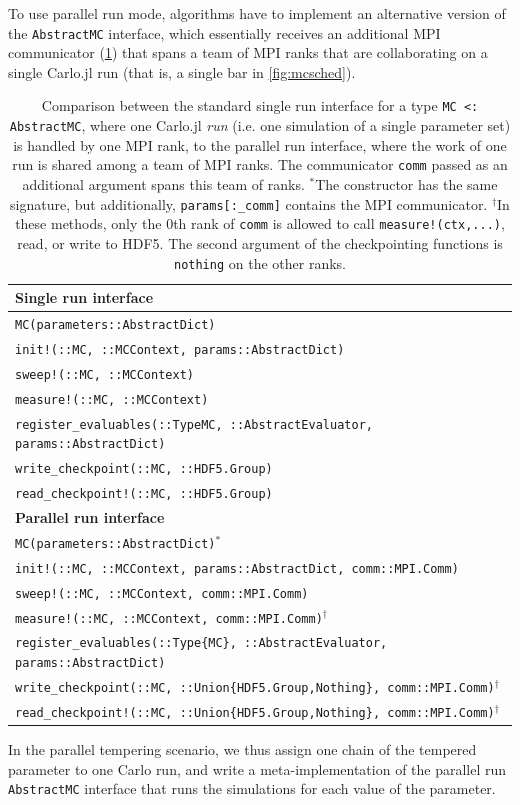 \documentclass{SciPost}
\begin{document}
To use parallel run mode, algorithms have to implement an alternative version of the \texttt{AbstractMC} interface, which essentially receives an additional MPI communicator (\cref{tab:parallelinterface}) that spans a team of MPI ranks that are collaborating on a single Carlo.jl run (that is, a single bar in \cref{fig:mcsched}).
\begin{table}
\begin{tabular}{l}
\hline
\textbf{Single run interface}\\
\hline
\texttt{MC(parameters::AbstractDict)}  \\
\texttt{init!(::MC, ::MCContext, params::AbstractDict)}\\
\texttt{sweep!(::MC, ::MCContext)}\\
\texttt{measure!(::MC, ::MCContext)}\\
\texttt{register\_{}evaluables(::Type{MC}, ::AbstractEvaluator, params::AbstractDict)}\\
\texttt{write\_{}checkpoint(::MC, ::HDF5.Group)}\\
\texttt{read\_{}checkpoint!(::MC, ::HDF5.Group)}\bigskip\\
\hline
\textbf{Parallel run interface}\\
\hline
\texttt{MC(parameters::AbstractDict)}$^*$\\
\texttt{init!(::MC, ::MCContext, params::AbstractDict, comm::MPI.Comm)}\\
\texttt{sweep!(::MC, ::MCContext, comm::MPI.Comm)}\\
\texttt{measure!(::MC, ::MCContext, comm::MPI.Comm)}$^{\dag}$\\
\texttt{register\_{}evaluables(::Type\{MC\}, ::AbstractEvaluator, params::AbstractDict)}\\
\texttt{write\_{}checkpoint(::MC, ::Union\{HDF5.Group,Nothing\}, comm::MPI.Comm)}$^\dag$\\
\texttt{read\_{}checkpoint!(::MC, ::Union\{HDF5.Group,Nothing\}, comm::MPI.Comm)}$^\dag$\\
\end{tabular}
\caption{Comparison between the standard single run interface for a type \texttt{MC <: AbstractMC}, where one Carlo.jl \textit{run} (i.e. one simulation of a single parameter set) is handled by one MPI rank, to the parallel run interface, where the work of one run is shared among a team of MPI ranks. The communicator \texttt{comm} passed as an additional argument spans this team of ranks. $^*$The constructor has the same signature, but additionally, \texttt{params[:\_{}comm]} contains the MPI communicator. $^\dag$In these methods, only the 0th rank of \texttt{comm} is allowed to call \texttt{measure!(ctx,...)}, read, or write to HDF5. The second argument of the checkpointing functions is \texttt{nothing} on the other ranks.}
\label{tab:parallelinterface}
\end{table}
In the parallel tempering scenario, we thus assign one chain of the tempered parameter to one Carlo run, and write a meta-implementation of the parallel run \texttt{AbstractMC} interface that runs the simulations for each value of the parameter.
\end{document}
